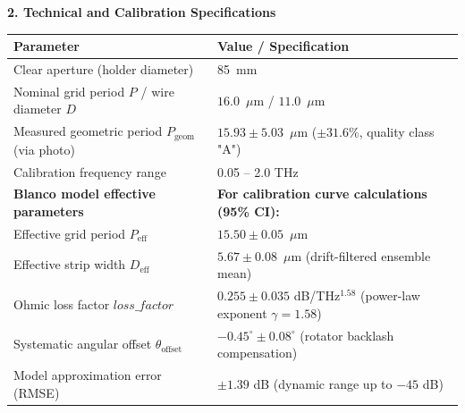 \documentclass[11pt]{article}
\begin{document}
	\vspace{0.3em}
	
	\noindent\textbf{2. Technical and Calibration Specifications}
	\begin{table}[H]
		\centering
		\small %
		\begin{tabularx}{\textwidth}{lX}
			\toprule
			\textbf{Parameter} & \textbf{Value / Specification} \\
			\midrule
			Clear aperture (holder diameter) & 85~mm \\
			Nominal grid period $P$ / wire diameter $D$ & $16.0$~$\mu$m / $11.0$~$\mu$m \\
			Measured geometric period $P_{\text{geom}}$ (via photo) & $15.93 \pm 5.03$~$\mu$m ($\pm 31.6\%$, quality class "A") \\
			Calibration frequency range & 0.05 -- 2.0 THz \\
			\midrule
			\textbf{Blanco model effective parameters} & \textbf{For calibration curve calculations (95\% CI):} \\
			Effective grid period $P_{\text{eff}}$ & $15.50 \pm 0.05$~$\mu$m \\
			Effective strip width $D_{\text{eff}}$\footnotemark[1] & $5.67 \pm 0.08$~$\mu$m (drift-filtered ensemble mean) \\
			Ohmic loss factor $loss\_factor$ & $0.255 \pm 0.035$ dB/THz$^{1.58}$ (power-law exponent $\gamma = 1.58$) \\
			Systematic angular offset $\theta_{\text{offset}}$ & $-0.45^\circ \pm 0.08^\circ$ (rotator backlash compensation) \\
			Model approximation error (RMSE)\footnotemark[2] & $\pm 1.39$ dB (dynamic range up to $-45$ dB) \\
			\bottomrule
		\end{tabularx}
	\end{table}
	
\end{document}
